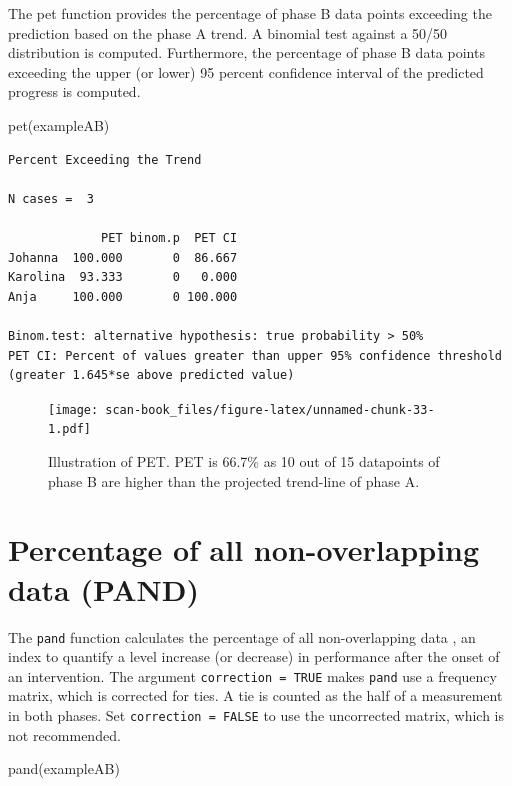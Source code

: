 \documentclass[
]{book}
\newenvironment{Shaded}{\begin{snugshade}}{\end{snugshade}}
\newcommand{\FunctionTok}[1]{\textcolor[rgb]{0.00,0.00,0.00}{#1}}
\newcommand{\NormalTok}[1]{#1}
\begin{document}
The pet function provides the percentage of phase B data points exceeding the prediction based on the phase A trend. A binomial test against a 50/50 distribution is computed. Furthermore, the percentage of phase B data points exceeding the upper (or lower) 95 percent confidence interval of the predicted progress is computed.

\begin{Shaded}
\begin{Highlighting}[]
\FunctionTok{pet}\NormalTok{(exampleAB)}
\end{Highlighting}
\end{Shaded}

\begin{verbatim}
Percent Exceeding the Trend

N cases =  3 

             PET binom.p  PET CI
Johanna  100.000       0  86.667
Karolina  93.333       0   0.000
Anja     100.000       0 100.000

Binom.test: alternative hypothesis: true probability > 50%
PET CI: Percent of values greater than upper 95% confidence threshold (greater 1.645*se above predicted value)
\end{verbatim}

\begin{figure}
\centering
\texttt{[image: scan-book\_files/figure-latex/unnamed-chunk-33-1.pdf]}
\caption{\label{fig:unnamed-chunk-33}Illustration of PET. PET is 66.7\% as 10 out of 15 datapoints of phase B are higher than the projected trend-line of phase A.}
\end{figure}

\hypertarget{percentage-of-all-non-overlapping-data-pand}{%
\section{Percentage of all non-overlapping data (PAND)}\label{percentage-of-all-non-overlapping-data-pand}}

The \texttt{pand} function calculates the percentage of all non-overlapping data \citep{parker_percentage_2007}, an index to quantify a level increase (or decrease) in performance after the onset of an intervention. The argument \texttt{correction\ =\ TRUE} makes \texttt{pand} use a frequency matrix, which is corrected for ties. A tie is counted as the half of a measurement in both phases. Set \texttt{correction\ =\ FALSE} to use the uncorrected matrix, which is not recommended.

\begin{Shaded}
\begin{Highlighting}[]
\FunctionTok{pand}\NormalTok{(exampleAB)}
\end{Highlighting}
\end{Shaded}
\end{document}
